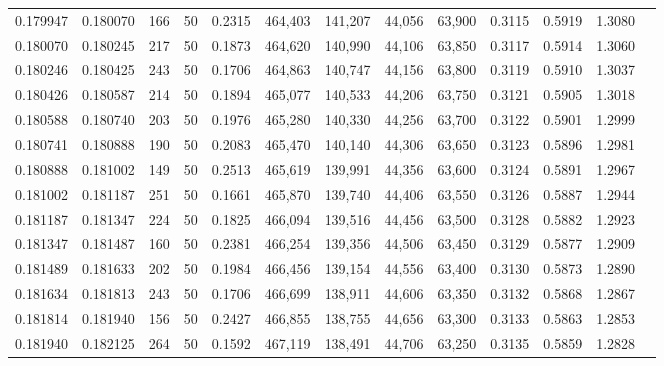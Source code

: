 \begin{tabular}{rrrrrrrrrrrrr}
0.179947 & 0.180070 &   166 &  50 &                                     0.2315 & 464,403 & 141,207 &  44,056 &  63,900 & 0.3115 & 0.5919 & 1.3080 \\
0.180070 & 0.180245 &   217 &  50 &                                     0.1873 & 464,620 & 140,990 &  44,106 &  63,850 & 0.3117 & 0.5914 & 1.3060 \\
0.180246 & 0.180425 &   243 &  50 &                                     0.1706 & 464,863 & 140,747 &  44,156 &  63,800 & 0.3119 & 0.5910 & 1.3037 \\
0.180426 & 0.180587 &   214 &  50 &                                     0.1894 & 465,077 & 140,533 &  44,206 &  63,750 & 0.3121 & 0.5905 & 1.3018 \\
0.180588 & 0.180740 &   203 &  50 &                                     0.1976 & 465,280 & 140,330 &  44,256 &  63,700 & 0.3122 & 0.5901 & 1.2999 \\
0.180741 & 0.180888 &   190 &  50 &                                     0.2083 & 465,470 & 140,140 &  44,306 &  63,650 & 0.3123 & 0.5896 & 1.2981 \\
0.180888 & 0.181002 &   149 &  50 &                                     0.2513 & 465,619 & 139,991 &  44,356 &  63,600 & 0.3124 & 0.5891 & 1.2967 \\
0.181002 & 0.181187 &   251 &  50 &                                     0.1661 & 465,870 & 139,740 &  44,406 &  63,550 & 0.3126 & 0.5887 & 1.2944 \\
0.181187 & 0.181347 &   224 &  50 &                                     0.1825 & 466,094 & 139,516 &  44,456 &  63,500 & 0.3128 & 0.5882 & 1.2923 \\
0.181347 & 0.181487 &   160 &  50 &                                     0.2381 & 466,254 & 139,356 &  44,506 &  63,450 & 0.3129 & 0.5877 & 1.2909 \\
0.181489 & 0.181633 &   202 &  50 &                                     0.1984 & 466,456 & 139,154 &  44,556 &  63,400 & 0.3130 & 0.5873 & 1.2890 \\
0.181634 & 0.181813 &   243 &  50 &                                     0.1706 & 466,699 & 138,911 &  44,606 &  63,350 & 0.3132 & 0.5868 & 1.2867 \\
0.181814 & 0.181940 &   156 &  50 &                                     0.2427 & 466,855 & 138,755 &  44,656 &  63,300 & 0.3133 & 0.5863 & 1.2853 \\
0.181940 & 0.182125 &   264 &  50 &                                     0.1592 & 467,119 & 138,491 &  44,706 &  63,250 & 0.3135 & 0.5859 & 1.2828 \\

\end{tabular}
